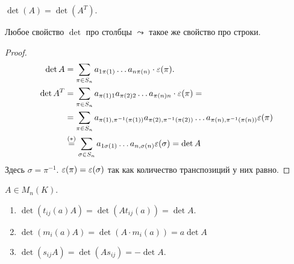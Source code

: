 \begin{theorem}
    $\det(A) = \det(A^T)$.
\end{theorem}
\begin{consequence}
    Любое свойство $\det$ про столбцы  $\leadsto$ такое же свойство про строки.
\end{consequence}
\begin{proof}
    \begin{align*}
    \det A &= \sum\limits_{\pi \in S_n} a_{1\pi(1)}\ldots a_{n\pi(n)} \cdot \varepsilon(\pi).\\
    \det A^T &= \sum\limits_{\pi \in S_n} a_{\pi(1)1} a_{\pi(2)2}\ldots a_{\pi(n)n} \cdot \varepsilon(\pi) = \\
             &= \sum\limits_{\pi \in S_n} a_{\pi(1), \pi^{-1}(\pi(1))} a_{\pi(2), \pi^{-1}(\pi(2))} \ldots a_{\pi(n), \pi^{-1}(\pi(n))} \varepsilon(\pi)\\
             &\stackrel{(*)}{=} \sum\limits_{\sigma \in S_n} a_{1\sigma(1)}\ldots a_{n, \sigma(n)} \varepsilon(\sigma) = \det A
    \end{align*}
    Здесь $\sigma = \pi^{-1}$.  $\varepsilon(\pi) = \varepsilon(\sigma)$ так как количество транспозиций у них равно.
\end{proof}
\begin{theorem}
    $A \in M_n(K)$. 
     \begin{enumerate}
         \item $\det (t_{ij}(a)A) = \det(A t_{ij}(a)) = \det A$.
         \item $\det(m_i(a)A) = \det(A \cdot m_i(a)) = a \det A$
         \item  $\det(s_{ij} A) = \det(A s_{ij}) = -\det A$.
    \end{enumerate}
\end{theorem}
